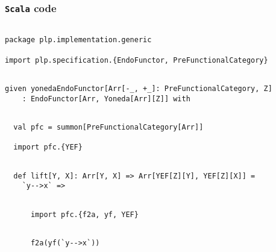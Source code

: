 \documentclass[11pt]{article}
\newcommand{\code}{\subsubsection{{\tt Scala} code}\begingroup\rm \vspace{12pt}}
\def\edefn{\endgroup\par\pagebreak[2]\addvspace{\medskipamount}}
\let\ecode=\edefn
\begin{document}
\code
\vspace{6pt}
\begin{mdframed}[backgroundcolor=lightgray!20] 
\begin{lstlisting}

package plp.implementation.generic

import plp.specification.{EndoFunctor, PreFunctionalCategory}
\end{lstlisting}
\end{mdframed}
\vspace{6pt}
\begin{mdframed}[backgroundcolor=lightgray!20] 
\begin{lstlisting}

given yonedaEndoFunctor[Arr[-_, +_]: PreFunctionalCategory, Z]
    : EndoFunctor[Arr, Yoneda[Arr][Z]] with
\end{lstlisting}
\end{mdframed}
\vspace{6pt}
\begin{mdframed}[backgroundcolor=lightgray!20] 
\begin{lstlisting}

  val pfc = summon[PreFunctionalCategory[Arr]]
  
  import pfc.{YEF}
\end{lstlisting}
\end{mdframed}
\vspace{6pt}
\begin{mdframed}[backgroundcolor=lightgray!20] 
\begin{lstlisting}

  def lift[Y, X]: Arr[Y, X] => Arr[YEF[Z][Y], YEF[Z][X]] =
    `y-->x` =>
\end{lstlisting}
\end{mdframed}
\vspace{6pt}
\begin{mdframed}[backgroundcolor=lightgray!20] 
\begin{lstlisting}

      import pfc.{f2a, yf, YEF}
\end{lstlisting}
\end{mdframed}
\vspace{6pt}
\begin{mdframed}[backgroundcolor=lightgray!20] 
\begin{lstlisting}

      f2a(yf(`y-->x`))
\end{lstlisting}
\end{mdframed}
\ecode
\end{document}
